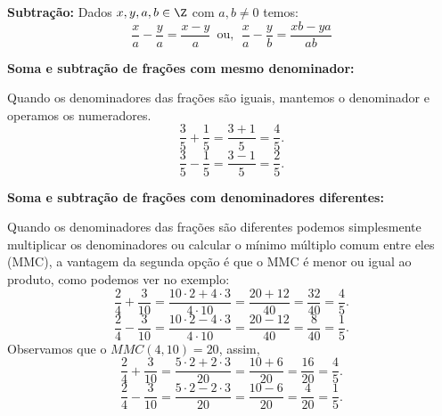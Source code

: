 \colorbox{azul}{
 \begin{minipage}{0.9\linewidth}
 \begin{center}
  \textbf{Subtração:} Dados $x, y, a, b \in \Z$ com $a, b \neq 0$ temos:
 \[\frac{x}{a} - \frac{y}{a}= \frac{x-y}{a} \, \text{ ou}, \ \
 \frac{x}{a} - \frac{y}{b}= \frac{xb - ya}{ab} \]
 \end{center}
 \end{minipage}}

 \vskip0.3cm

 \begin{exem}
  \textbf{Soma e subtração de frações com mesmo denominador:}

   Quando os denominadores das frações são iguais, mantemos o denominador e operamos os numeradores.
    \vskip0.3cm
\begin{equation}
\frac{3}{5} + \frac{1}{5}= \frac{3+1}{5}= \frac{4}{5} .
\end{equation}
    \vskip0.3cm
\begin{equation}
\frac{3}{5} - \frac{1}{5}= \frac{3-1}{5}= \frac{2}{5} .
\end{equation}
 \end{exem}

 \begin{exem}
 \textbf{Soma e subtração de frações com denominadores diferentes:}

   Quando os denominadores das frações são diferentes podemos simplesmente multiplicar os denominadores ou calcular o mínimo múltiplo comum entre eles (MMC), a vantagem da segunda opção é que o MMC é menor ou igual ao produto, como podemos ver no exemplo:
    \vskip0.3cm
\begin{equation}
\frac{2}{4} + \frac{3}{10}= \frac{10 \cdot 2 + 4 \cdot 3}{4 \cdot 10}= \frac{20 + 12}{40}= \frac{32}{40}= \frac{4}{5} .
\end{equation}
    \vskip0.3cm
\begin{equation}
\frac{2}{4} - \frac{3}{10}= \frac{10 \cdot 2 - 4 \cdot 3}{4 \cdot 10}= \frac{20 - 12}{40}= \frac{8}{40}= \frac{1}{5} .
\end{equation}
    \vskip0.3cm
   Observamos que o $MMC(4, 10)= 20$, assim,
    \vskip0.3cm
\begin{equation}
\frac{2}{4} + \frac{3}{10}= \frac{5 \cdot 2 + 2 \cdot 3}{20}= \frac{10+6}{20}= \frac{16}{20}=\frac{4}{5} .
\end{equation}
    \vskip0.3cm
\begin{equation}
\frac{2}{4} - \frac{3}{10}= \frac{5 \cdot 2 - 2 \cdot 3}{20}= \frac{10 - 6}{20}= \frac{4}{20}=\frac{1}{5} .
\end{equation}
 \end{exem}


